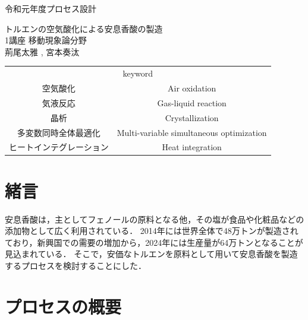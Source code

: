 \documentclass[a4j]{jsreport}
\begin{document}
\begin{titlepage}
\begin{flushleft}
{\Large 令和元年度プロセス設計} \\
\end{flushleft}
\vspace{5cm}
\centering
{\Huge トルエンの空気酸化による安息香酸の製造} \\
\vspace{2cm}
\centering
{\Large 1講座 移動現象論分野} \\
\vspace{0.5cm}
\centering
{\large 荊尾太雅 , 宮本奏汰} \\
\vspace{3cm}
\begin{table}[htbp]
    \begin{center}
        \begin{tabular}[htbp]{cc}
            \multicolumn{2}{c}{{\LARGE keyword}} \\
            {\Large 空気酸化}&{\Large Air oxidation} \\
            {\Large 気液反応}&{\Large Gas-liquid reaction} \\
            {\Large 晶析}&{\Large Crystallization} \\
            {\Large 多変数同時全体最適化}&{\Large Multi-variable simultaneous optimization} \\
            {\Large ヒートインテグレーション}&{\Large Heat integration} \\
        \end{tabular}
    \end{center}
\end{table}
\end{titlepage}


\setcounter{tocdepth}{2}
\tableofcontents

\clearpage
{}

\chapter{緒言}
安息香酸は，主としてフェノールの原料となる他，その塩が食品や化粧品などの添加物として広く利用されている．
2014年には世界全体で48万トンが製造されており，新興国での需要の増加から，2024年には生産量が64万トンとなることが見込まれている\cite{hexa}．
そこで，安価なトルエンを原料として用いて安息香酸を製造するプロセスを検討することにした．


\clearpage
\chapter{プロセスの概要}
\end{document}
